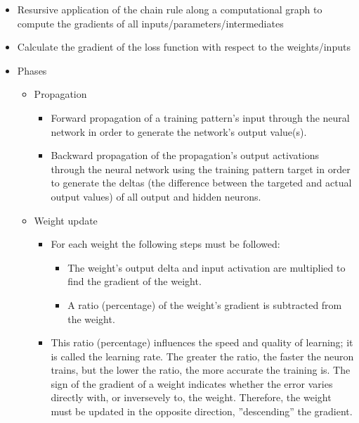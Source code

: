\documentclass{scrartcl}
\begin{document}
\begin{itemize}
	\item Resursive application of the chain rule along a computational graph to compute the gradients of all inputs/parameters/intermediates
	\item Calculate the gradient of the loss function with respect to the weights/inputs
	\item Phases
	\begin{itemize}
		\item Propagation
		\begin{itemize}
			\item Forward propagation of a training pattern's input through the neural network in order to generate the network's output value(s).
			\item Backward propagation of the propagation's output activations through the neural network using the training pattern target in order to generate the deltas (the difference between the targeted and actual output values) of all output and hidden neurons.
		\end{itemize}
		\item Weight update
		\begin{itemize}
			\item For each weight the following steps must be followed:
			\begin{itemize}
				\item The weight's output delta and input activation are multiplied to find the gradient of the weight.
				\item A ratio (percentage) of the weight's gradient is subtracted from the weight.
			\end{itemize}
			\item This ratio (percentage) influences the speed and quality of learning; it is called the learning rate. The greater the ratio, the faster the neuron trains, but the lower the ratio, the more accurate the training is. The sign of the gradient of a weight indicates whether the error varies directly with, or inversevely to, the weight. Therefore, the weight must be updated in the opposite direction, ''descending'' the gradient.
		\end{itemize}
	\end{itemize}
\end{itemize}
\end{document}
